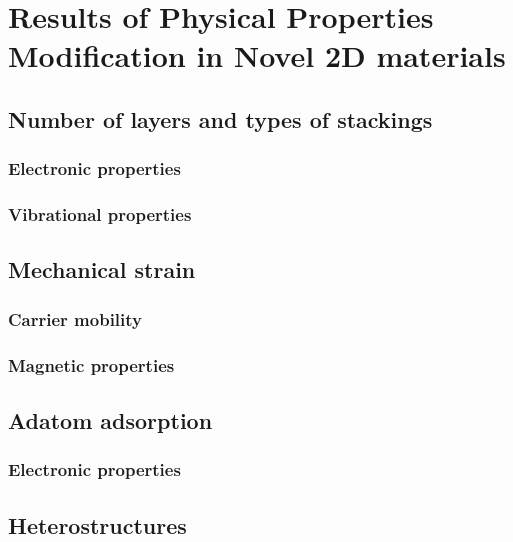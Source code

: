 
\chapter{Results of Physical Properties Modification in Novel 2D materials}

\ifpdf
    \graphicspath{{Chapter5/Figs/Raster/}{Chapter5/Figs/PDF/}{Chapter5/Figs/}}
\else
    \graphicspath{{Chapter5/Figs/Vector/}{Chapter5/Figs/}}
\fi


\section{Number of layers and types of stackings}
\subsection{Electronic properties}
\subsection{Vibrational properties}

\section{Mechanical strain}
\subsection{Carrier mobility}
\subsection{Magnetic properties}

\section{Adatom adsorption}
\subsection{Electronic properties}

\section{Heterostructures}

